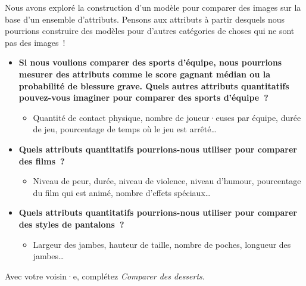 \documentclass[12pt,a4paper]{article}
\begin{document}
\begin{thinkbox}
  Nous avons exploré la construction d'un modèle pour comparer des images sur la base d'un ensemble d'attributs. Pensons aux attributs à partir desquels nous pourrions construire des modèles pour d'autres catégories de choses qui ne sont pas des images~!

  \begin{itemize}
    \item \textbf{Si nous voulions comparer des sports d'équipe, nous pourrions mesurer des attributs comme le \textbf{score gagnant médian} ou la \textbf{probabilité de blessure grave}. Quels autres attributs quantitatifs pouvez-vous imaginer pour comparer des sports d'équipe~?}
    \begin{itemize}
      \item Quantité de contact physique, nombre de joueur·euses par équipe, durée de jeu, pourcentage de temps où le jeu est arrêté…
    \end{itemize}
    \item \textbf{Quels attributs quantitatifs pourrions-nous utiliser pour comparer des films~?}
    \begin{itemize}
      \item Niveau de peur, durée, niveau de violence, niveau d'humour, pourcentage du film qui est animé, nombre d'effets spéciaux…
    \end{itemize}
    \item \textbf{Quels attributs quantitatifs pourrions-nous utiliser pour comparer des styles de pantalons~?}
    \begin{itemize}
      \item Largeur des jambes, hauteur de taille, nombre de poches, longueur des jambes…
    \end{itemize}
  \end{itemize}
\end{thinkbox}

\begin{activitybox}
  Avec votre voisin·e, complétez \emph{Comparer des desserts}.
\end{activitybox}
\end{document}
